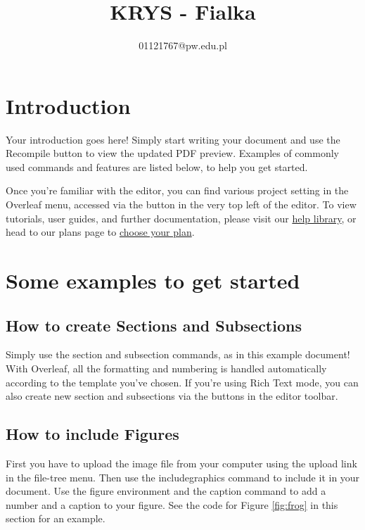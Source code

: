 \documentclass{article}
\title{KRYS - Fialka}
\author{01121767@pw.edu.pl}
\begin{document}
    \maketitle


    \section{Introduction}

    Your introduction goes here! Simply start writing your document and use the Recompile button to view the updated PDF preview. Examples of commonly used commands and features are listed below, to help you get started.

    Once you're familiar with the editor, you can find various project setting in the Overleaf menu, accessed via the button in the very top left of the editor. To view tutorials, user guides, and further documentation, please visit our \href{https://www.overleaf.com/learn}{help library}, or head to our plans page to \href{https://www.overleaf.com/user/subscription/plans}{choose your plan}.


    \section{Some examples to get started}

    \subsection{How to create Sections and Subsections}

    Simply use the section and subsection commands, as in this example document! With Overleaf, all the formatting and numbering is handled automatically according to the template you've chosen. If you're using Rich Text mode, you can also create new section and subsections via the buttons in the editor toolbar.

    \subsection{How to include Figures}

    First you have to upload the image file from your computer using the upload link in the file-tree menu. Then use the includegraphics command to include it in your document. Use the figure environment and the caption command to add a number and a caption to your figure. See the code for Figure \ref{fig:frog} in this section for an example.
\end{document}
